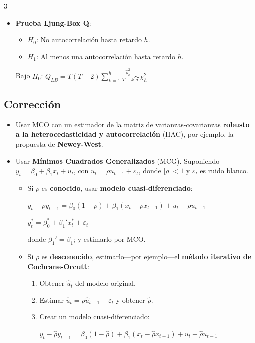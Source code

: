 \documentclass[10pt, a4paper, landscape]{article}
\begin{document}
\begin{multicols}{3}
\begin{itemize}[leftmargin=*]
	\item \textbf{Prueba Ljung-Box Q}:
	\begin{itemize}[leftmargin=*]
		\item \( H_{0} \): No autocorrelación hasta retardo \( h \).
		\item \( H_{1} \): Al menos una autocorrelación hasta retardo \( h \).
	\end{itemize}
	\begin{center}
		Bajo \( H_{0} \): \quad \( Q_{LB} = T (T + 2) \sum_{k = 1}^{h} \frac{\hat{\rho}_{k}^{2}}{T - k} \underset{a}{\sim} \chi_{h}^{2} \)
	\end{center}
\end{itemize}

\columnbreak

\subsection*{Corrección}

\begin{itemize}[leftmargin=*]
	\item Usar MCO con un estimador de la matriz de varianzas-covarianzas \textbf{robusto a la heterocedasticidad y autocorrelación} (HAC), por ejemplo, la propuesta de \textbf{Newey-West}.
	\item Usar \textbf{Mínimos Cuadrados Generalizados} (MCG). Suponiendo \( y_{t} = \beta_{0} + \beta_{1} x_{t} + u_{t} \), con \( u_{t} = \rho u_{t - 1} + \varepsilon_{t} \), donde \( \lvert \rho \rvert < 1 \) y \( \varepsilon_{t} \) es \underline{ruido blanco}.
	\begin{itemize}[leftmargin=*]
		\item Si \( \rho \) es \textbf{conocido}, usar \textbf{modelo cuasi-diferenciado}:
		\begin{center}
			\( y_{t} - \rho y_{t - 1}= \beta_{0} (1 - \rho) + \beta_{1} (x_{t} - \rho x_{t - 1}) + u_{t} - \rho u_{t - 1} \)

			\( y_{t}^{*} = \beta_{0}^{*} + \beta_{1}' x_{t}^{*} + \varepsilon_{t} \)
		\end{center}
		donde \( \beta_{1}' = \beta_{1} \); y estimarlo por MCO.
		\item Si \( \rho \) es \textbf{desconocido}, estimarlo---por ejemplo---el \textbf{método iterativo de Cochrane-Orcutt}:
		\begin{enumerate}[leftmargin=*]
			\item Obtener \( \hat{u}_{t} \) del modelo original.
			\item Estimar \( \hat{u}_{t} = \rho \hat{u}_{t - 1} + \varepsilon_{t} \) y obtener \( \hat{\rho} \).
			\item Crear un modelo cuasi-diferenciado:
			\begin{center}
				\( y_{t} - \hat{\rho}y_{t - 1} = \beta_{0} (1 - \hat{\rho}) + \beta_{1} (x_{t} - \hat{\rho} x_{t - 1}) + u_{t} - \hat{\rho}u_{t - 1} \)


\end{center}
\end{enumerate}
\end{itemize}
\end{itemize}
\end{multicols}
\end{document}
